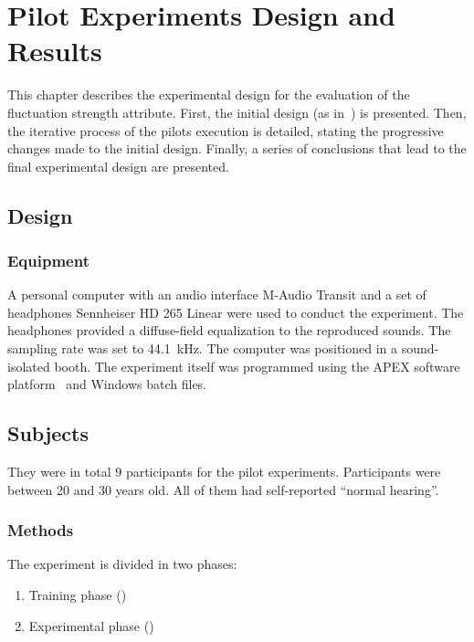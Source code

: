 \documentclass[../main.tex]{subfiles}
\begin{document}
\chapter{Pilot Experiments Design and Results}
\label{cha:pilot}

This chapter describes the experimental design for the evaluation of the
fluctuation strength attribute. First, the initial design (as
in~\cite{Fastl1982Fluctuation}) is presented. Then, the iterative process of the
pilots execution is detailed, stating the progressive changes made to the
initial design. Finally, a series of conclusions that lead to the final
experimental design are presented.

\section{Design}

\subsection{Equipment}
\label{subsec:pilot_equipment}

A personal computer with an audio interface M-Audio Transit and a set of
headphones Sennheiser HD 265 Linear were used to conduct the experiment. The
headphones provided a diffuse-field equalization to the reproduced sounds. The
sampling rate was set to 44.1~kHz. The computer was positioned in a
sound-isolated booth. The experiment itself was programmed using the APEX
software platform~\cite{Francart2008} and Windows batch files.

\section{Subjects}

They were in total 9 participants for the pilot experiments. Participants were
between 20 and 30 years old. All of them had self-reported ``normal hearing''.

\subsection{Methods}

The experiment is divided in two phases:
\begin{enumerate}
  \item Training phase ()
  \item Experimental phase ()
\end{enumerate}
\end{document}
